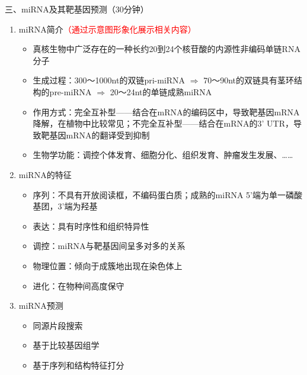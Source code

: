 \documentclass{TIJMUjiaoanLL}
\begin{document}
\noindent
三、miRNA及其靶基因预测（30分钟）
\begin{enumerate}
  \item miRNA简介\textcolor{red}{（通过示意图形象化展示相关内容）}
    \begin{itemize}
      \item 真核生物中广泛存在的一种长约20到24个核苷酸的内源性非编码单链RNA分子
      \item 生成过程：300～1000nt的双链pri-miRNA $\Rightarrow$ 70～90nt的双链具有茎环结构的pre-miRNA $\Rightarrow$ 20～24nt的单链成熟miRNA
      \item 作用方式：完全互补型——结合在mRNA的编码区中，导致靶基因mRNA降解，在植物中比较常见；不完全互补型——结合在mRNA的3' UTR，导致靶基因mRNA的翻译受到抑制
      \item 生物学功能：调控个体发育、细胞分化、组织发育、肿瘤发生发展、……
    \end{itemize}
  \item miRNA的特征
    \begin{itemize}
      \item 序列：不具有开放阅读框，不编码蛋白质；成熟的miRNA 5'端为单一磷酸基团，3'端为羟基
      \item 表达：具有时序性和组织特异性
      \item 调控：miRNA与靶基因间呈多对多的关系
      \item 物理位置：倾向于成簇地出现在染色体上
      \item 进化：在物种间高度保守
    \end{itemize}
  \item miRNA预测
    \begin{itemize}
      \item 同源片段搜索
      \item 基于比较基因组学
      \item 基于序列和结构特征打分

\end{itemize}
\end{enumerate}
\end{document}

